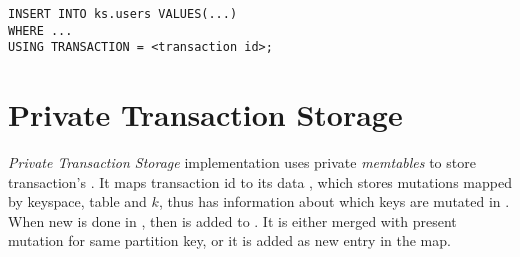






\begin{lstlisting}[style=outcode,label={lst:insertUsingTx},caption={Insert statement with using transactional clause}]
INSERT INTO ks.users VALUES(...) 
WHERE ...
USING TRANSACTION = <transaction id>;
\end{lstlisting}


\section{Private Transaction Storage}
\emph{Private Transaction Storage} implementation uses private \emph{memtables} to store transaction's \mutations. It maps transaction id to its data , which stores mutations mapped by keyspace, table and $k$, thus \txStorage has information about which keys are mutated in \transaction. 
When new  is done in \transaction, then  is added to . 
It is either merged with present mutation for same partition key, or it is added as new entry in the map.


